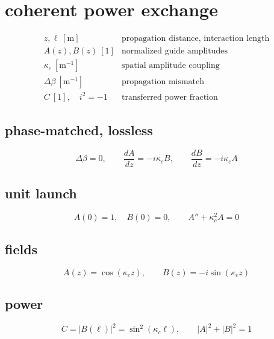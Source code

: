 \section*{coherent power exchange}
\[
\begin{array}{ll}z,\ell\ [\mathrm m]&\text{propagation distance, interaction length}\\[0.6em]A(z),B(z)\ [1]&\text{normalized guide amplitudes}\\[0.6em]\kappa_c\ [\mathrm{m^{-1}}]&\text{spatial amplitude coupling}\\[0.6em]\Delta\beta\ [\mathrm{m^{-1}}]&\text{propagation mismatch}\\[0.6em]C\ [1],\quad i^2=-1&\text{transferred power fraction}\end{array}
\]
\subsection*{phase-matched, lossless}
\[
\displaystyle \Delta\beta=0,\qquad\frac{dA}{dz}=-i\kappa_c B,\qquad\frac{dB}{dz}=-i\kappa_c A
\]
\subsection*{unit launch}
\[
\displaystyle A(0)=1,\quad B(0)=0,\qquad A''+\kappa_c^2A=0
\]
\subsection*{fields}
\[
\displaystyle A(z)=\cos(\kappa_c z),\qquad B(z)=-i\sin(\kappa_c z)
\]
\subsection*{power}
\[
\displaystyle C=|B(\ell)|^2=\sin^2(\kappa_c\ell),\qquad|A|^2+|B|^2=1
\]
